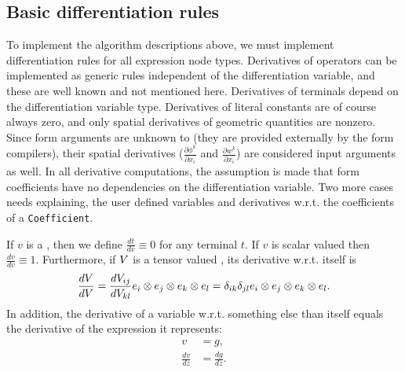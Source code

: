 \subsection{Basic differentiation rules}

To implement the algorithm descriptions above, we must implement
differentiation rules for all expression node types. Derivatives
of operators can be implemented as generic rules independent of the
differentiation variable, and these are well known and not mentioned
here. Derivatives of terminals depend on the differentiation variable
type.  Derivatives of literal constants are of course always zero,
and only spatial derivatives of geometric quantities are nonzero.
Since form arguments are unknown to \ufl{} (they are provided externally
by the form compilers), their spatial derivatives ($\frac{\partial
  \phi^k}{\partial x_i}$ and $\frac{\partial w^k}{\partial x_i}$) are
considered input arguments as well.  In all derivative computations,
the assumption is made that form coefficients have no dependencies
on the differentiation variable.  Two more cases needs explaining,
the user defined variables and derivatives w.r.t. the coefficients of
a \texttt{Coefficient}.

If $v$ is a , then we define $\frac{d t}{d v} \equiv 0$
for any terminal $t$. If $v$ is scalar valued then $\frac{d v}{d v}
\equiv 1$. Furthermore, if ${V}$ is a tensor valued ,
its derivative w.r.t. itself is
\begin{align}
\frac{d {V}}{d {V}}
    =
    \frac{d V_{ij}}{d V_{kl}}
    {e}_i\otimes{e}_j\otimes{e}_k\otimes{e}_l
    =
    \delta_{ik}\delta_{jl}
    {e}_i\otimes{e}_j\otimes{e}_k\otimes{e}_l .
\end{align}
In addition, the derivative of a variable w.r.t. something else than
itself equals the derivative of the expression it represents:\vspace*{-2.5pt}
\begin{align}
v &= g, \\
\frac{d v}{d z} &= \frac{d g}{d z}.
\end{align}


